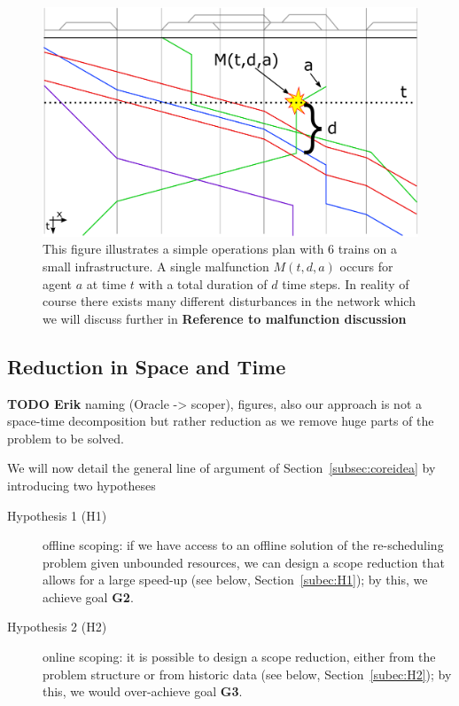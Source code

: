 \documentclass{article}
\begin{document}
%
\begin{figure}[hbtp]
	\centering
  \includegraphics[width=\textwidth]{Figures/malfunction_generation.pdf}
	\caption{This figure illustrates a simple operations plan with 6 trains on a small infrastructure. A single malfunction $M(t,d,a)$ occurs for agent $a$ at time $t$ with a total duration of $d$ time steps. In reality of course there exists many different disturbances in the network which we will discuss further in \textbf{Reference to malfunction discussion}}
	\label{fig:introduction_no_loop}
\end{figure}

\subsection{Reduction in Space and Time}\label{subec:scopers}

\begin{mdframed}
{\bf TODO Erik} naming (Oracle -> scoper), figures, also our approach is not a space-time decomposition but rather reduction as we remove huge parts of the problem to be solved.
\end{mdframed}

We will now detail the general line of argument of Section~\ref{subsec:coreidea} by introducing two hypotheses
\begin{description}
\item [Hypothesis 1 (H1)] offline scoping: if we have access to an offline solution of the re-scheduling problem given unbounded resources, we can design a scope reduction that allows for a large speed-up (see below, Section~\ref{subec:H1}); by this, we achieve goal \textbf{G2}.
\item [Hypothesis 2 (H2)] online scoping: it is possible to design a scope reduction, either from the problem structure or from historic data (see below, Section~\ref{subec:H2}); by this, we would over-achieve goal \textbf{G3}.
\end{description}
\end{document}
